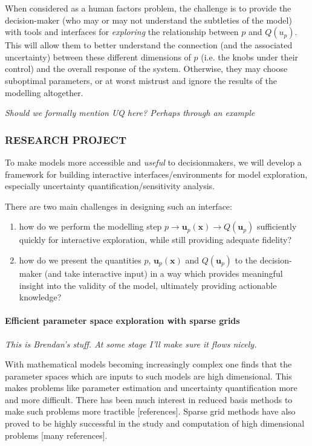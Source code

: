 \documentclass[a4paper,fontsize=12pt]{scrartcl}
\begin{document}
When considered as a human factors problem, the challenge is to provide
the decision-maker (who may or may not understand the subtleties of
the model) with tools and interfaces for \emph{exploring} the
relationship between $p$ and $Q(u_p)$. This will allow them to better
understand the connection (and the associated uncertainty) between
these different dimensions of $p$ (i.e. the knobs under their control)
and the overall response of the system. Otherwise, they may choose
suboptimal parameters, or at worst mistrust and ignore the results of
the modelling altogether.

\emph{Should we formally mention UQ here? Perhaps through an example}

\subsubsection*{RESEARCH PROJECT}

To make models more accessible and \emph{useful} to decisionmakers, we
will develop a framework for building interactive
interfaces/environments for model exploration, especially uncertainty
quantification/sensitivity analysis.

There are two main challenges in designing such an interface:
\begin{enumerate}
\item how do we perform the modelling step $p \rightarrow
  \mathbf{u}_p(\mathbf{x}) \rightarrow Q(\mathbf{u}_p)$ sufficiently quickly
  for interactive exploration, while still providing adequate
  fidelity?
\item how do we present the quantities $p$, $\mathbf{u}_p(\mathbf{x})$
  and $Q(\mathbf{u}_p)$ to the decision-maker (and take interactive input) in a
  way which provides meaningful insight into the validity of the
  model, ultimately providing actionable knowledge?
\end{enumerate}

\paragraph{Efficient parameter space exploration with sparse grids}

\emph{This is Brendan's stuff. At some stage I'll make sure it flows
  nicely.}

With mathematical models becoming increasingly complex one finds that
the parameter spaces which are inputs to such models are high
dimensional. This makes problems like parameter estimation and
uncertainty quantification more and more difficult. There has been
much interest in reduced basis methods to make such problems more
tractible [references]. Sparse grid methods have also proved to be
highly successful in the study and computation of high dimensional
problems [many references].
\end{document}
